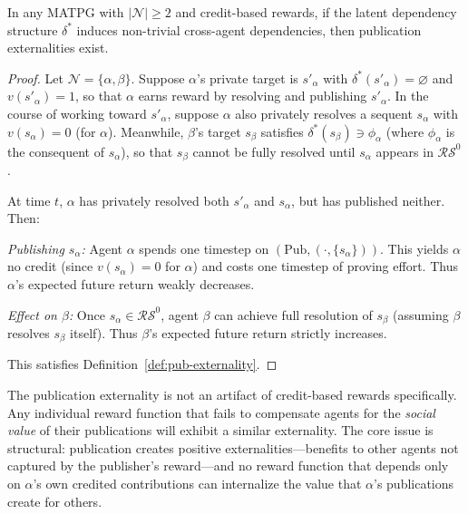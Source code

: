 \begin{theorem}\label{thm:externality}
In any MATPG with $|\mathcal{N}|\ge 2$ and credit-based rewards, if the latent dependency structure $\delta^*$ induces non-trivial cross-agent dependencies, then publication externalities exist.
\end{theorem}

\begin{proof}
Let $\mathcal{N} = \{\alpha,\beta\}$. Suppose $\alpha$'s private target is $s'_\alpha$ with $\delta^*(s'_\alpha) = \varnothing$ and $v(s'_\alpha) = 1$, so that $\alpha$ earns reward by resolving and publishing $s'_\alpha$. In the course of working toward $s'_\alpha$, suppose $\alpha$ also privately resolves a sequent $s_\alpha$ with $v(s_\alpha) = 0$ (for $\alpha$). Meanwhile, $\beta$'s target $s_\beta$ satisfies $\delta^*(s_\beta) \ni \phi_\alpha$ (where $\phi_\alpha$ is the consequent of $s_\alpha$), so that $s_\beta$ cannot be fully resolved until $s_\alpha$ appears in $\mathcal{RS}^0$.

At time $t$, $\alpha$ has privately resolved both $s'_\alpha$ and $s_\alpha$, but has published neither. Then:

\emph{Publishing $s_\alpha$:} Agent $\alpha$ spends one timestep on $(\mathrm{Pub},(\cdot,\{s_\alpha\}))$. This yields $\alpha$ no credit (since $v(s_\alpha) = 0$ for $\alpha$) and costs one timestep of proving effort. Thus $\alpha$'s expected future return weakly decreases.

\emph{Effect on $\beta$:} Once $s_\alpha\in\mathcal{RS}^0$, agent $\beta$ can achieve full resolution of $s_\beta$ (assuming $\beta$ resolves $s_\beta$ itself). Thus $\beta$'s expected future return strictly increases.

This satisfies Definition~\ref{def:pub-externality}.
\end{proof}

\begin{remark}
The publication externality is not an artifact of credit-based rewards specifically. Any individual reward function that fails to compensate agents for the \emph{social value} of their publications will exhibit a similar externality. The core issue is structural: publication creates positive externalities---benefits to other agents not captured by the publisher's reward---and no reward function that depends only on $\alpha$'s own credited contributions can internalize the value that $\alpha$'s publications create for others.
\end{remark}



